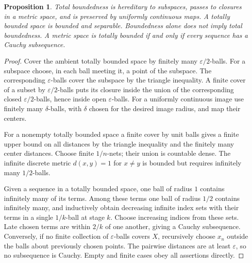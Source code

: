 \documentclass[11pt,oneside,openany]{book}
\newtheorem{proposition}[theorem]{Proposition}
\theoremstyle{definition}
\theoremstyle{remark}
\newcommand{\eps}{\varepsilon}
\begin{document}
\begin{proposition}\label{d10:09:total-bounded-basics}
Total boundedness is hereditary to subspaces, passes to closures in a metric space, and is preserved by uniformly continuous maps. A totally bounded space is bounded and separable. Boundedness alone does not imply total boundedness. A metric space is totally bounded if and only if every sequence has a Cauchy subsequence.
\end{proposition}
\begin{proof}
Cover the ambient totally bounded space by finitely many $\eps/2$-balls. For a subspace choose, in each ball meeting it, a point of the subspace. The corresponding $\eps$-balls cover the subspace by the triangle inequality. A finite cover of a subset by $\eps/2$-balls puts its closure inside the union of the corresponding closed $\eps/2$-balls, hence inside open $\eps$-balls. For a uniformly continuous image use finitely many $\delta$-balls, with $\delta$ chosen for the desired image radius, and map their centers.

For a nonempty totally bounded space a finite cover by unit balls gives a finite upper bound on all distances by the triangle inequality and the finitely many center distances. Choose finite $1/n$-nets; their union is countable dense. The infinite discrete metric $d(x,y)=1$ for $x\ne y$ is bounded but requires infinitely many $1/2$-balls.

Given a sequence in a totally bounded space, one ball of radius $1$ contains infinitely many of its terms. Among these terms one ball of radius $1/2$ contains infinitely many, and inductively obtain decreasing infinite index sets with their terms in a single $1/k$-ball at stage $k$. Choose increasing indices from these sets. Late chosen terms are within $2/k$ of one another, giving a Cauchy subsequence. Conversely, if no finite collection of $\eps$-balls covers $X$, recursively choose $x_n$ outside the balls about previously chosen points. The pairwise distances are at least $\eps$, so no subsequence is Cauchy. Empty and finite cases obey all assertions directly.
\end{proof}
\end{document}
